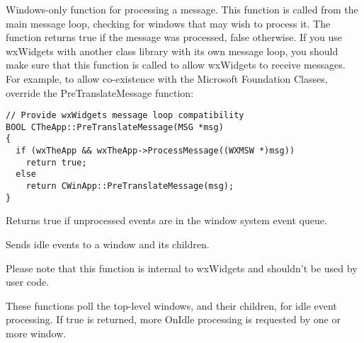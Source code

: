 \label{wxappprocessmessage}


Windows-only function for processing a message. This function
is called from the main message loop, checking for windows that
may wish to process it. The function returns true if the message
was processed, false otherwise. If you use wxWidgets with another class
library with its own message loop, you should make sure that this
function is called to allow wxWidgets to receive messages. For example,
to allow co-existence with the Microsoft Foundation Classes, override
the PreTranslateMessage function:

\begin{verbatim}
// Provide wxWidgets message loop compatibility
BOOL CTheApp::PreTranslateMessage(MSG *msg)
{
  if (wxTheApp && wxTheApp->ProcessMessage((WXMSW *)msg))
    return true;
  else
    return CWinApp::PreTranslateMessage(msg);
}
\end{verbatim}


\label{wxapppending}


Returns true if unprocessed events are in the window system event queue.




\label{wxappsendidleevents}


Sends idle events to a window and its children.

Please note that this function is internal to wxWidgets and shouldn't be used
by user code.


These functions poll the top-level windows, and their children, for idle event processing.
If true is returned, more OnIdle processing is requested by one or more window.




\label{wxappsetappname}


